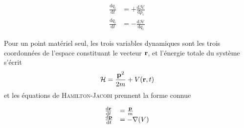 \documentclass[svgnames,dvipsnames,a4paper,10pt,french]{report}
\begin{document}
\begin{equation}
    \begin{array}{ll}
        \frac{\mathrm{d}q_i}{\mathrm{d}t} &= +\frac{\mathrm{d}\mathcal{H}}{\mathrm{d}p_i} \\
        \frac{\mathrm{d}q_i}{\mathrm{d}t} &= -\frac{\mathrm{d}\mathcal{H}}{\mathrm{d}q_i}
    \end{array}
\end{equation}

Pour un point matériel seul, les trois variables dynamiques sont les trois coordonnées de l'espace constituant le vecteur $\mathbf{r}$, et l'énergie totale du système s'écrit 
\begin{equation}
    \mathcal{H} = \frac{\mathbf{p}^2}{2m} + V(\mathbf{r} ,t)
\end{equation}
et les équations de \textsc{Hamilton-Jacobi} prennent la forme connue

\begin{equation}
    \begin{array}{ll}
        \frac{\mathrm{d}\mathbf{r}}{\mathrm{d}t} &= \frac{\mathbf{p}}{m} \\
        \frac{\mathrm{d}\mathbf{p}}{\mathrm{d}t} &= -\nabla(V)
    \end{array}
\end{equation}
\end{document}
